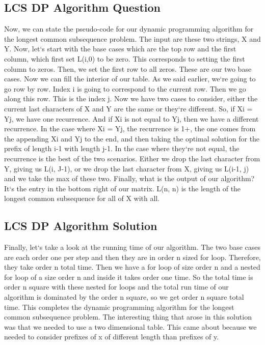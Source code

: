 \subsection{LCS  DP Algorithm Question}
Now, we can state the pseudo-code for our dynamic programming algorithm for the longest common subsequence problem.
The input are these two strings, X and Y\@.
Now, let`s start with the base cases which are the top row and the first column, which first set L(i,0) to be zero.
This corresponds to setting the first column to zeros.
Then, we set the first row to all zeros.
These are our two base cases.
Now we can fill the interior of our table.
As we said earlier, we`re going to go row by row.
Index i is going to correspond to the current row.
Then we go along this row.
This is the index j.
Now we have two cases to consider, either the current last characters of X and Y are the same or they`re different.
So, if Xi = Yj, we have one recurrence.
And if Xi is not equal to Yj, then we have a different recurrence.
In the case where Xi = Yj, the recurrence is 1+, the one comes from the appending Xi and Yj to the end, and then taking the optimal solution for the prefix of length i-1 with length j-1.
In the case where they`re not equal, the recurrence is the best of the two scenarios.
Either we drop the last character from Y, giving us L(i, J-1), or we drop the last character from X, giving us L(i-1, j) and we take the max of these two.
Finally, what is the output of our algorithm? It`s the entry in the bottom right of our matrix.
L(n, n) is the length of the longest common subsequence for all of X with all.

\subsection{LCS  DP Algorithm Solution}
Finally, let`s take a look at the running time of our algorithm.
The two base cases are each order one per step and then they are in order n sized for loop.
Therefore, they take order n total time.
Then we have a for loop of size order n and a nested for loop of a size order n and inside it takes order one time.
So the total time is order n square with these nested for loops and the total run time of our algorithm is dominated by the order n square, so we get order n square total time.
This completes the dynamic programming algorithm for the longest common subsequence problem.
The interesting thing that arose in this solution was that we needed to use a two dimensional table.
This came about because we needed to consider prefixes of x of different length than prefixes of y.

